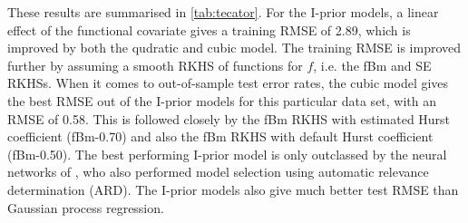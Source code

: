 \documentclass[showframe,11pt,twoside,openright]{report}\usepackage[]{graphicx}\usepackage[]{color}
\begin{document}
These results are summarised in \cref{tab:tecator}.
For the I-prior models, a linear effect of the functional covariate gives a training RMSE of 2.89, which is improved by both the qudratic and cubic model.
The training RMSE is improved further by assuming a smooth RKHS of functions for $f$, i.e. the fBm and SE RKHSs.
When it comes to out-of-sample test error rates, the cubic model gives the best RMSE out of the I-prior models for this particular data set, with an RMSE of 0.58.
This is followed closely by the fBm RKHS with estimated Hurst coefficient (fBm-0.70) and also the fBm RKHS with default Hurst coefficient (fBm-0.50).
The best performing I-prior model is only outclassed by the neural networks of \citet{thodberg1996review}, who also performed model selection using automatic relevance determination (ARD).
The I-prior models also give much better test RMSE than Gaussian process regression.
\end{document}
